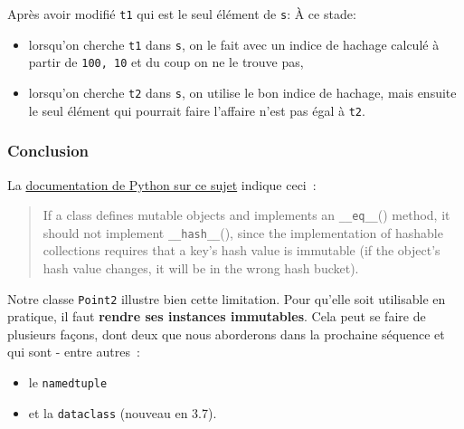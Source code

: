 Après avoir modifié \texttt{t1} qui est le seul élément de \texttt{s}: À
ce stade:

\begin{itemize}
\tightlist
\item
  lorsqu'on cherche \texttt{t1} dans \texttt{s}, on le fait avec un
  indice de hachage calculé à partir de \texttt{100,\ 10} et du coup on
  ne le trouve pas,
\item
  lorsqu'on cherche \texttt{t2} dans \texttt{s}, on utilise le bon
  indice de hachage, mais ensuite le seul élément qui pourrait faire
  l'affaire n'est pas égal à \texttt{t2}.
\end{itemize}

    \hypertarget{conclusion}{%
\subsubsection{Conclusion}\label{conclusion}}

    La
\href{https://docs.python.org/3/reference/datamodel.html\#object.__hash__}{documentation
de Python sur ce sujet} indique ceci~:

\begin{quote}
If a class defines mutable objects and implements an
\texttt{\_\_eq\_\_}() method, it should not implement
\texttt{\_\_hash\_\_}(), since the implementation of hashable
collections requires that a key's hash value is immutable (if the
object's hash value changes, it will be in the wrong hash bucket).
\end{quote}

    Notre classe \texttt{Point2} illustre bien cette limitation. Pour
qu'elle soit utilisable en pratique, il faut \textbf{rendre ses
instances immutables}. Cela peut se faire de plusieurs façons, dont deux
que nous aborderons dans la prochaine séquence et qui sont - entre
autres~:

\begin{itemize}
\tightlist
\item
  le \texttt{namedtuple}
\item
  et la \texttt{dataclass} (nouveau en 3.7).
\end{itemize}


    
    
    
